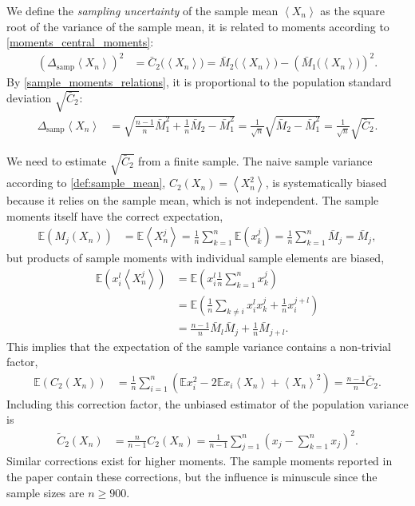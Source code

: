 \documentclass[12pt,a4paper]{article}
\renewcommand{\|}{\rule[-0.4ex]{0.2ex}{1.2em}}
\begin{document}
We define the \emph{sampling uncertainty} of the sample mean $\left \langle X_n \right \rangle $  as the square root of the variance of the sample mean, it is related to moments according to \cref{moments_central_moments}:
\begin{align}\label{def:sampling_uncertainty}
	\left(\Delta_{\text{samp}} \left \langle X_n \right \rangle \right)^2&= \bar C_2 \big(\left \langle X_n \right \rangle  \big)  = \bar M_2 \big(\left \langle X_n \right \rangle  \big) -\left( \bar M_1 \big(\left \langle X_n \right \rangle  \big) \right)  ^2.
\end{align}
By \cref{sample_moments_relations}, it is proportional to the population standard deviation  $\sqrt{\bar C_2}$:
\begin{align}\label{uncertainty_sampling_theo} 
	\Delta_{\text{samp}} \left \langle X_n \right \rangle  &= \sqrt{\frac{n-1}{n} \bar M_1^2 + \frac 1 n \bar M_2 - \bar M_1^2 } = \frac{1}{\sqrt n} \sqrt{\bar M_2-\bar M_1^2} = \frac{1}{\sqrt n } \sqrt{\bar C_2}.
\end{align}

We need to estimate $\sqrt{\bar C_2}$ from a finite sample. The naive sample variance according to \cref{def:sample_mean}, $C_2(X_n   )=\left \langle X_n^2 \right \rangle  $, is systematically biased because it relies on the sample mean, which  is not independent. The sample moments itself have the correct expectation,
\begin{align*}
	\mathbb E \left( M_j(X_n) \right)   &=\mathbb E \left \langle X_n^j \right \rangle = \frac 1 n \sum_{k=1}^n \mathbb E(x_k^j) = \frac 1 n \sum_{k=1}^n \bar M_j = \bar M_j,
\end{align*}
but products of sample moments with individual sample elements are biased,
\begin{align*}
	\mathbb E \left( x_i^l \left \langle X_n^j \right \rangle   \right) &= \mathbb E \left( x_i^l \frac 1 n \sum_{k=1}^n x_k^j \right) \\&= \mathbb E \left(  \frac 1 n \sum_{k \neq i} x_i^l x_k^j +\frac 1 n x_i^{j+l}\right)\\& = \frac{n-1}{n} \bar M_l \bar M_j + \frac 1 n \bar M_{j+l}.
\end{align*}
This implies that the expectation of the sample variance contains  a non-trivial factor,
\begin{align*}
	\mathbb E \left( C_2(X_n) \right) &= \frac 1 n \sum_{i=1}^n \left( \mathbb E x_i^2 - 2 \mathbb E x_i \left \langle X_n \right \rangle + \left \langle X_n \right \rangle ^2 \right) = \frac{n-1}{n} \bar C_2.
\end{align*}
Including this correction factor, the unbiased estimator of the population variance is
\begin{align}\label{def:sample_variance}
	\tilde C_2(X_n) &= \frac{n}{n-1}C_2 (X_n)=  \frac{1}{n-1}\sum_{j=1}^n \left( x_j  -  \sum_{k=1}^n x_j  \right) ^2 .
\end{align}
Similar corrections exist for higher moments.
The sample moments reported in the paper contain these corrections, but the influence is minuscule since the sample sizes  are $n \geq 900$. 
\end{document}
